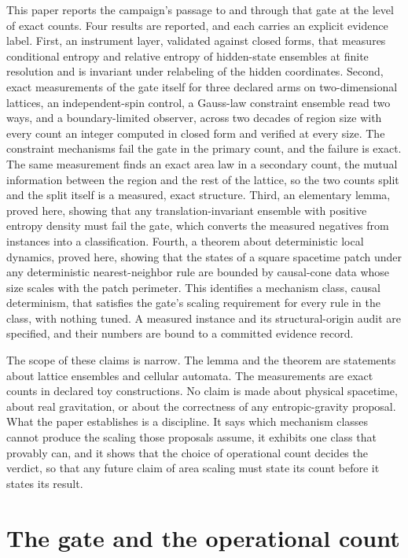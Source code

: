 \documentclass[aps,pre,reprint,nofootinbib]{revtex4-2}
\begin{document}
This paper reports the campaign's passage to and through that gate at the
level of exact counts.  Four results are reported, and each carries an
explicit evidence label.  First, an instrument layer, validated against
closed forms, that measures conditional entropy and relative entropy of
hidden-state ensembles at finite resolution and is invariant under
relabeling of the hidden coordinates.  Second, exact measurements of the
gate itself for three declared arms on two-dimensional lattices, an
independent-spin control, a Gauss-law constraint ensemble read two ways,
and a boundary-limited observer, across two decades of region size with
every count an integer computed in closed form and verified at every
size.  The constraint mechanisms fail the gate in the primary count, and
the failure is exact.  The same measurement finds an exact area law in a
secondary count, the mutual information between the region and the rest
of the lattice, so the two counts split and the split itself is a
measured, exact structure.  Third, an elementary lemma, proved here,
showing that any translation-invariant ensemble with positive entropy
density must fail the gate, which converts the measured negatives from
instances into a classification.  Fourth, a theorem about deterministic
local dynamics, proved here, showing that the states of a square
spacetime patch under any deterministic nearest-neighbor rule are bounded
by causal-cone data whose size scales with the patch perimeter.  This
identifies a mechanism class, causal determinism, that satisfies the
gate's scaling requirement for every rule in the class, with nothing
tuned.  A measured instance and its structural-origin audit are specified,
and their numbers are bound to a committed evidence record.

The scope of these claims is narrow.  The lemma and the theorem are
statements about lattice ensembles and cellular automata.  The
measurements are exact counts in declared toy constructions.  No claim is
made about physical spacetime, about real gravitation, or about the
correctness of any entropic-gravity proposal.  What the paper establishes
is a discipline.  It says which mechanism classes cannot produce the
scaling those proposals assume, it exhibits one class that provably can,
and it shows that the choice of operational count decides the verdict, so
that any future claim of area scaling must state its count before it
states its result.

\section{The gate and the operational count}
\label{sec:gate}
\end{document}
